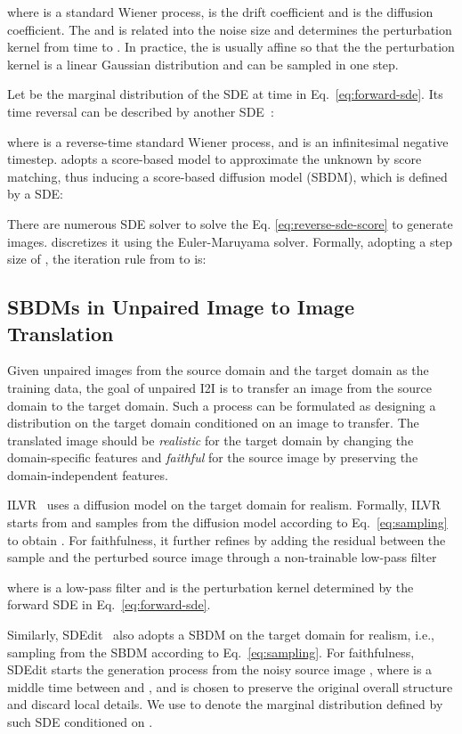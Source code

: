 \documentclass{article}
\begin{document}
where  is a standard Wiener process,  is the drift coefficient and  is the diffusion coefficient. The  and  is related into the noise size and determines the perturbation kernel  from time  to . In practice, the  is usually affine so that the the perturbation kernel is a linear Gaussian distribution and can be sampled in one step.

Let  be the marginal distribution of the SDE at time  in Eq.~\eqref{eq:forward-sde}. Its time reversal can be described by another SDE~\cite{song2020score}:

where  is a reverse-time standard
Wiener process, and  is an infinitesimal negative timestep. \cite{song2020score} adopts a score-based model  to approximate the unknown  by score matching, thus inducing a score-based diffusion model (SBDM), which is defined by a SDE:

There are numerous SDE solver to solve the Eq. \eqref{eq:reverse-sde-score} to generate images. \cite{song2020score} discretizes it using the Euler-Maruyama solver. Formally, adopting a step size of , the iteration rule from  to  is:

\subsection{SBDMs in Unpaired Image to Image Translation}
\label{sec:back_i2i}
Given unpaired images from the source domain  and the target domain  as the training data, the goal of unpaired I2I is to transfer an image from the source domain to the target domain. Such a process can be formulated as designing a distribution  on the target domain  conditioned on an image  to transfer. 
The translated image should be \emph{realistic} for the target domain by changing the domain-specific features and \emph{faithful} for the source image by preserving the domain-independent features.

ILVR~\cite{choi2021ilvr} uses a diffusion model on the target domain for realism. Formally, ILVR starts from  and samples from the diffusion model according to Eq.~\eqref{eq:sampling} to obtain . For faithfulness, it further refines  by adding the residual between the sample  and the perturbed source image  through a non-trainable low-pass filter

where  is a low-pass filter and  is the perturbation kernel determined by the forward SDE in Eq.~\eqref{eq:forward-sde}.

Similarly, SDEdit~\cite{meng2021sdedit} also adopts a SBDM on the target domain for realism, i.e., sampling from the SBDM according to Eq.~\eqref{eq:sampling}. For faithfulness, SDEdit starts the generation process from the noisy source image , where  is a middle time between  and , and is chosen to preserve the original overall structure and discard local details. We use  to denote the marginal distribution defined by such SDE conditioned on .
\end{document}
